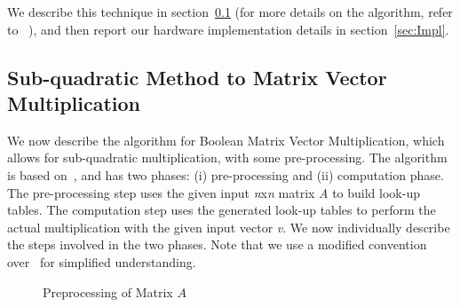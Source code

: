 \documentclass[conference, 9pt]{IEEEtran}
\begin{document}
We describe this technique in section~\ref{sec:BMVM} (for more details on the algorithm, refer to
~\cite{williams2007matrix}), and then report our hardware implementation details in
section~\ref{sec:Impl}.\\


\subsection{Sub-quadratic Method to Matrix Vector Multiplication}\label{sec:BMVM}

We now describe the algorithm for Boolean Matrix Vector Multiplication, which allows for
sub-quadratic multiplication, with some pre-processing. The algorithm is based
on~\cite{williams2007matrix}, and has two phases: (i) pre-processing and (ii) computation phase. The
pre-processing step uses the given input \emph{n}x\emph{n} matrix \emph{A} to build look-up tables.
The computation step uses the generated look-up tables to perform the actual multiplication with the
given input vector \emph{v}. We now individually describe the steps involved in the two phases. Note
that we use a modified convention over~\cite{williams2007matrix} for simplified understanding.\\

\begin{figure}[t!]
\centering
{}
\caption{Preprocessing of Matrix $A$}	
\label{pre-process}
\end{figure}
\end{document}
